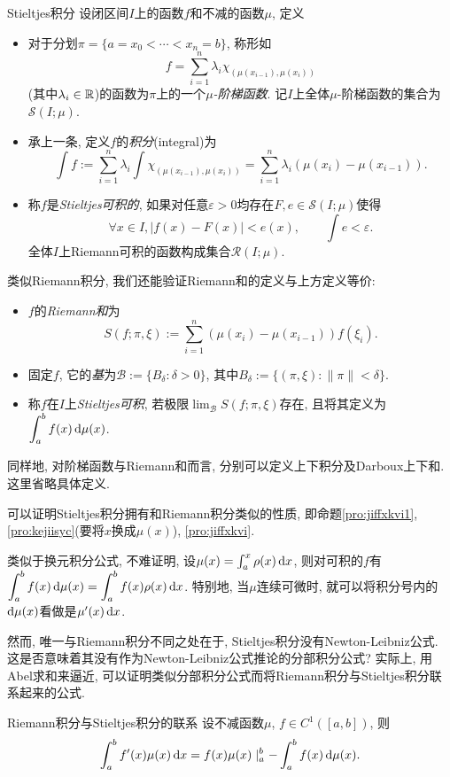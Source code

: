 \begin{definition}{Stieltjes积分}
	设闭区间$I$上的函数$f$和不减的函数$\mu$, 定义
	\begin{itemize}
		\item 对于分划$\pi = \{ a=x_0<\cdots <x_n=b \}$, 称形如$$f = \sum_{i=1}^{n} \lambda _i \chi _{(\mu (x_{i-1}),\mu (x_{i}))} $$
		(其中$\lambda _i \in \mathbb{R}$)的函数为$\pi$上的一个\textit{$\mu$-阶梯函数}. 记$I$上全体$\mu$-阶梯函数的集合为$\mathcal{S}(I;\mu )$. 
		\item 承上一条, 定义$f$的\textit{积分}(integral)为$$\int f := \sum_{i=1}^{n} \lambda _i \int \chi _{(\mu (x_{i-1}), \mu (x_i))} = \sum_{i=1}^{n} \lambda _i (\mu (x_i)-\mu (x_{i-1})). $$
		\item 称$f$是\textit{Stieltjes可积的}, 如果对任意$\varepsilon >0$均存在$F,e \in \mathcal{S}(I;\mu )$使得$$\forall x \in I,|f(x)-F(x)|<e(x),\qquad \int e < \varepsilon .$$
	全体$I$上Riemann可积的函数构成集合$\mathcal{R}(I;\mu)$. 
	\end{itemize}
	类似Riemann积分, 我们还能验证Riemann和的定义与上方定义等价: 
	\begin{itemize}
		\item $f$的\textit{Riemann和}为$$S(f;\pi ,\xi) := \sum_{i=1}^{n} (\mu(x_i)-\mu(x_{i-1}))f(\xi _i) .$$
		\item 固定$f$, 它的\textit{基}为$\mathcal{B} := \{ B_{\delta}:\delta >0 \}$, 其中$B_{\delta} := \{ (\pi ,\xi) : \| \pi \|< \delta \}$. 
		\item 称$f$在$I$上\textit{Stieltjes可积}, 若极限$\displaystyle \lim_{\mathcal{B}} S(f;\pi ,\xi)$存在, 且将其定义为$\displaystyle \int_a^b f(x) \mathop{}\!\mathrm{d} \mu (x)$. 
	\end{itemize}
\end{definition}

同样地, 对阶梯函数与Riemann和而言, 分别可以定义上下积分及Darboux上下和. 这里省略具体定义. 

可以证明Stieltjes积分拥有和Riemann积分类似的性质, 即命题\ref{pro:jiffxkvi1}, \ref{pro:kejiisyc}(要将$x$换成$\mu (x)$), \ref{pro:jiffxkvi}. 

类似于换元积分公式, 不难证明, 设$\mu (x) = \int_a^x \rho (x)\mathop{}\!\mathrm{d} x$, 则对可积的$f$有$\displaystyle \int_a^b f(x) \mathop{}\!\mathrm{d} \mu (x) = \int_a^b f(x) \rho (x) \mathop{}\!\mathrm{d} x$. 特别地, 当$\mu$连续可微时, 就可以将积分号内的$\mathop{}\!\mathrm{d} \mu (x)$看做是$\mu '(x) \mathop{}\!\mathrm{d} x$. 

然而, 唯一与Riemann积分不同之处在于, Stieltjes积分没有Newton-Leibniz公式. 这是否意味着其没有作为Newton-Leibniz公式推论的分部积分公式? 实际上, 用Abel求和来逼近, 可以证明类似分部积分公式而将Riemann积分与Stieltjes积分联系起来的公式. 

\begin{proposition}{Riemann积分与Stieltjes积分的联系}
	设不减函数$\mu$, $f \in C^1([a,b])$, 则$$\int_a^b f'(x)\mu (x) \mathop{}\!\mathrm{d} x = f(x)\mu (x) \mid _a^b - \int_a^b f(x) \mathop{}\!\mathrm{d} \mu (x) .$$
\end{proposition}















